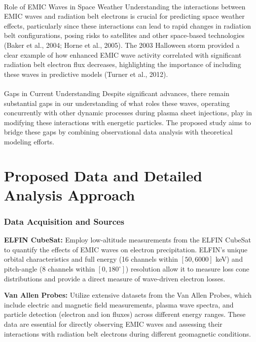 \documentclass[
  letterpaper,
  DIV=11,
  numbers=noendperiod]{scrartcl}
\makeatletter
\let\oldparagraph\paragraph
\renewcommand{\paragraph}{
    \@ifstar
      \xxxParagraphStar
      \xxxParagraphNoStar
  }
\newcommand{\xxxParagraphStar}[1]{\oldparagraph*{#1}\mbox{}}
\newcommand{\xxxParagraphNoStar}[1]{\oldparagraph{#1}\mbox{}}
\makeatother
\begin{document}
\paragraph{Role of EMIC Waves in Space Weather}\label{role-of-emic-waves-in-space-weather}
Understanding the interactions between EMIC waves and radiation belt electrons is crucial for predicting space weather effects, particularly since these interactions can lead to rapid changes in radiation belt configurations, posing risks to satellites and other space-based technologies (Baker et al., 2004; Horne et al., 2005). The 2003 Halloween storm provided a clear example of how enhanced EMIC wave activity correlated with significant radiation belt electron flux decreases, highlighting the importance of including these waves in predictive models (Turner et al., 2012).

\paragraph{Gaps in Current Understanding}\label{gaps-in-current-understanding}
Despite significant advances, there remain substantial gaps in our understanding of what roles these waves, operating concurrently with other dynamic processes during plasma sheet injections, play in modifying these interactions with energetic particles. The proposed study aims to bridge these gaps by combining observational data analysis with theoretical modeling efforts.

\section{Proposed Data and Detailed Analysis Approach}\label{proposed-data-and-detailed-analysis-approach}

\subsubsection{Data Acquisition and Sources}\label{data-acquisition-and-sources}

\textbf{ELFIN CubeSat:} Employ low-altitude measurements from the ELFIN CubeSat to quantify the effects of EMIC waves on electron precipitation. ELFIN's unique orbital characteristics and full energy (16 channels within \([50,6000]\) keV) and pitch-angle (8 channels within \([0,180^\circ]\)) resolution allow it to measure loss cone distributions and provide a direct measure of wave-driven electron losses.

\textbf{Van Allen Probes:} Utilize extensive datasets from the Van Allen Probes, which include electric and magnetic field measurements, plasma wave spectra, and particle detection (electron and ion fluxes) across different energy ranges. These data are essential for directly observing EMIC waves and assessing their interactions with radiation belt electrons during different geomagnetic conditions.
\end{document}
